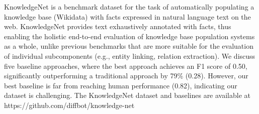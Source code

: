 KnowledgeNet is a benchmark dataset for the task of automatically populating a knowledge base (Wikidata) with facts expressed in natural language text on the web.
KnowledgeNet provides text exhaustively annotated with facts, thus enabling the holistic end-to-end evaluation of knowledge base population systems as a whole, unlike previous benchmarks that are more suitable for the evaluation of individual subcomponents (e.g., entity linking, relation extraction). We discuss five baseline approaches, where the best approach achieves an F1 score of 0.50, significantly outperforming a traditional approach by 79\% (0.28). However, our best baseline is far from reaching human performance (0.82), indicating our dataset is challenging. The KnowledgeNet dataset and baselines are available at https://github.com/diffbot/knowledge-net